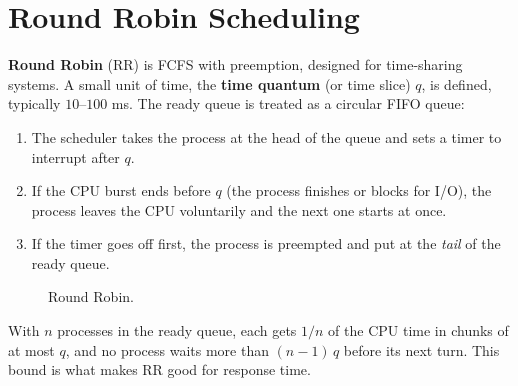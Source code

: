 \documentclass[11pt,a4paper]{article}
\newcommand{\term}[1]{\textbf{\color{mintdeep}#1}}
\begin{document}
\section{Round Robin Scheduling}

\term{Round Robin} (RR) is FCFS with preemption, designed for time-sharing systems. A small unit of time, the \term{time quantum} (or time slice) $q$, is defined, typically $10$--$100$ ms. The ready queue is treated as a circular FIFO queue:
\begin{enumerate}[leftmargin=1.4em]
  \item The scheduler takes the process at the head of the queue and sets a timer to interrupt after $q$.
  \item If the CPU burst ends before $q$ (the process finishes or blocks for I/O), the process leaves the CPU voluntarily and the next one starts at once.
  \item If the timer goes off first, the process is preempted and put at the \emph{tail} of the ready queue.
\end{enumerate}

\begin{figure}[H]
\centering
{}
\caption{Round Robin.}
\end{figure}

With $n$ processes in the ready queue, each gets $1/n$ of the CPU time in chunks of at most $q$, and no process waits more than $(n-1)\,q$ before its next turn. This bound is what makes RR good for response time.
\end{document}
